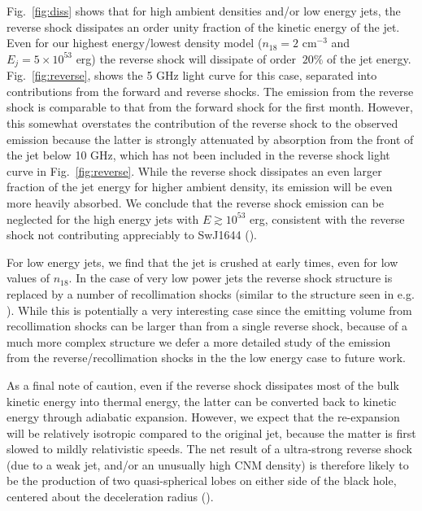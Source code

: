 \documentclass[usenatbib,fleqn]{mnras}
\begin{document}
Fig.~\ref{fig:diss} shows that for high ambient densities and/or low
energy jets, the reverse shock dissipates an order unity fraction of
the kinetic energy of the jet.  Even for our highest energy/lowest
density model ($n_{18}=2$ cm$^{-3}$ and $E_j=5\times 10^{53}$ erg) the
reverse shock will dissipate of order $~20\%$ of the jet energy.
Fig.~\ref{fig:reverse}, shows the 5 GHz light curve for this case,
separated into contributions from the forward and reverse shocks.  The
emission from the reverse shock is comparable to that from the forward
shock for the first month.  However, this somewhat overstates the
contribution of the reverse shock to the observed emission because the
latter is strongly attenuated by absorption from the front of the jet
below 10 GHz, which has not been included in the reverse shock light
curve in Fig.~\ref{fig:reverse}.  While the reverse shock dissipates
an even larger fraction of the jet energy for higher ambient density,
its emission will be even more heavily absorbed.  We conclude that the
reverse shock emission can be neglected for the high energy jets with
$E\gtrsim 10^{53}$ erg, consistent with the reverse shock not
contributing appreciably to SwJ1644 (\citealt{Metzger+2012}).

For low energy jets, we find that the jet is crushed at early times,
even for low values of $n_{18}$. In the case of very low power jets
the reverse shock structure is replaced by a number of recollimation
shocks (similar to the structure seen in
e.g. \citealt{Mimica+2009}). While this is potentially a very
interesting case since the emitting volume from recollimation shocks
can be larger than from a single reverse shock, because of a much more
complex structure we defer a more detailed study of the emission from
the reverse/recollimation shocks in the the low energy case to future
work.

As a final note of caution, even if the reverse shock dissipates most
of the bulk kinetic energy into thermal energy, the latter can be
converted back to kinetic energy through adiabatic expansion.
However, we expect that the re-expansion will be relatively isotropic
compared to the original jet, because the matter is first slowed to
mildly relativistic speeds.  The net result of a ultra-strong reverse
shock (due to a weak jet, and/or an unusually high CNM density) is
therefore likely to be the production of two quasi-spherical lobes on
either side of the black hole, centered about the deceleration radius
(\citealt{Giannios&Metzger2011}).
\end{document}
